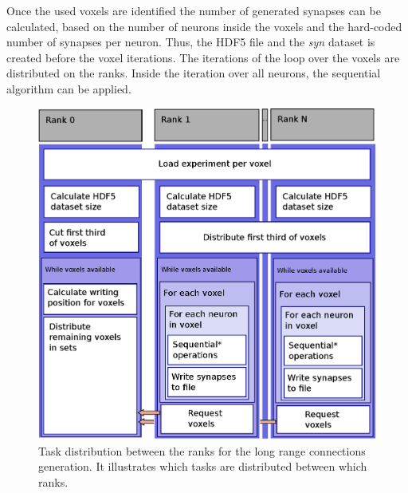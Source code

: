 Once the used voxels are identified the number of generated synapses can be calculated, based on the
number of neurons inside the voxels and the hard-coded number of synapses per neuron.
Thus, the HDF5 file and the \emph{syn} dataset is created before the voxel iterations.
The iterations of the loop over the voxels are distributed on the ranks.
Inside the iteration over all neurons, the sequential algorithm can be applied.
\begin{figure}[ht!]
\centering
\includegraphics[scale=0.5]{pictures/longRange_parallelAlg.eps}
\caption{Task distribution between the ranks for the long range connections generation. It illustrates which tasks are distributed between which ranks.}
\label{fig:longrangParallel}
\end{figure}

